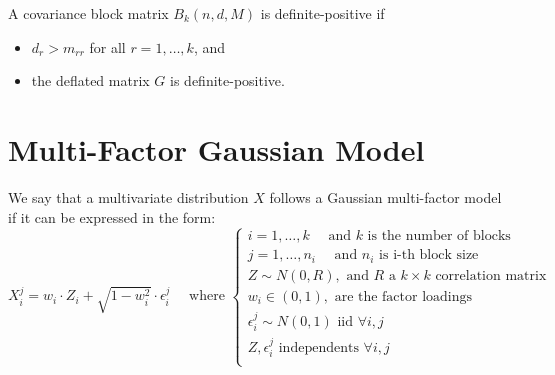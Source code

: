 \documentclass[11pt,fleqn]{book} %
\begin{document}
\begin{corollary}
	A covariance block matrix $B_k(n,d,M)$ is definite-positive if
	\begin{itemize}
		\item $d_r > m_{rr}$ for all $r=1,\dots,k$, and
		\item the deflated matrix $G$ is definite-positive.
	\end{itemize}
\end{corollary}

\section{Multi-Factor Gaussian Model}

\begin{definition}
	We say that a multivariate distribution $X$ follows a Gaussian multi-factor
	model if it can be expressed in the form:
	\begin{displaymath}
		X_i^j = w_i \cdot Z_i + \sqrt{1-w_i^2} \cdot \epsilon_i^j
		\quad \text{ where } \left\{
		\begin{array}{l}
			i = 1, \dots, k \quad \text{ and $k$ is the number of blocks}    \\
			j = 1, \dots, n_i \quad \text{ and $n_i$ is i-th block size}     \\
			Z \sim N(0,R), \text{ and $R$ a $k \times k$ correlation matrix} \\
			w_i \in (0,1), \text{ are the factor loadings }                  \\
			\epsilon_i^j \sim N(0,1) \text { iid } \forall i,j               \\
			Z, \epsilon_i^j \text{ independents } \forall i,j                \\
		\end{array}
		\right.
	\end{displaymath}
\end{definition}
\end{document}
